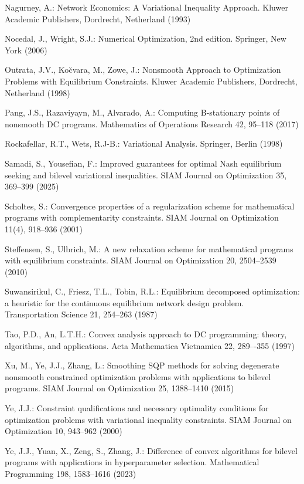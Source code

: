 \documentclass[11pt,a4paper]{article}
\theoremstyle{plain}
\begin{document}
\begin{thebibliography}{}
Nagurney, A.: 
Network Economics: A Variational Inequality Approach. 
Kluwer Academic Publishers, Dordrecht, Netherland (1993)

Nocedal, J., Wright, S.J.: 
Numerical Optimization, 2nd edition. 
Springer, New York (2006)

Outrata, J.V., Ko\u cvara, M., Zowe, J.:
Nonsmooth Approach to Optimization Problems with Equilibrium Constraints. 
Kluwer Academic Publishers, Dordrecht, Netherland (1998)



Pang, J.S., Razaviyayn, M., Alvarado, A.: 
Computing B-stationary points of nonsmooth DC programs. 
Mathematics of Operations Research 42, 95--118 (2017)

Rockafellar, R.T., Wets, R.J-B.: 
Variational Analysis.  Springer, Berlin (1998)

Samadi, S., Yousefian, F.: 
Improved guarantees for optimal Nash equilibrium seeking and bilevel variational inequalities. 
SIAM Journal on Optimization 35, 369--399 (2025)

Scholtes, S.: 
Convergence properties of a regularization scheme for mathematical programs with complementarity
constraints. 
SIAM Journal on Optimization 11(4), 918--936 (2001)

Steffensen, S., Ulbrich, M.: 
A new relaxation scheme for mathematical programs with equilibrium constraints.
SIAM Journal on Optimization 20, 2504--2539 (2010)

Suwansirikul, C., Friesz, T.L., Tobin, R.L.: 
Equilibrium decomposed optimization: a heuristic for the continuous equilibrium network design problem. 
Transportation Science 21, 254--263 (1987)

Tao, P.D.,  An, L.T.H.: 
Convex analysis approach to DC programming: theory, algorithms, and applications. 
Acta Mathematica Vietnamica 22, 289–-355 (1997)

Xu, M., Ye, J.J., Zhang, L.:
Smoothing SQP methods for solving degenerate nonsmooth constrained optimization problems with applications to bilevel programs.
SIAM Journal on Optimization 25, 1388--1410 (2015)


Ye, J.J.: 
Constraint qualifications and necessary optimality conditions for optimization problems with variational inequality constraints. 
SIAM Journal on Optimization 10, 943--962 (2000)

Ye, J.J., Yuan, X., Zeng, S., Zhang, J.: 
Difference of convex algorithms for bilevel programs with applications in hyperparameter selection. 
Mathematical Programming 198, 1583--1616 (2023)


\end{thebibliography}
\end{document}
